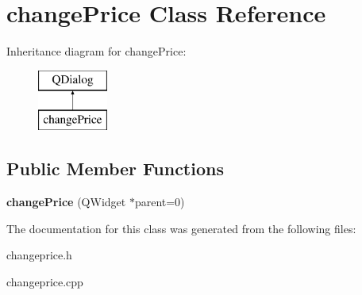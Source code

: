 \hypertarget{classchange_price}{}\section{change\+Price Class Reference}
\label{classchange_price}
Inheritance diagram for change\+Price\+:\begin{figure}[H]
\begin{center}
\leavevmode
\includegraphics[height=2.000000cm]{classchange_price}
\end{center}
\end{figure}
\subsection*{Public Member Functions}
\begin{DoxyCompactItemize}
\item 
\mbox{\label{classchange_price_a7bd9c2db0a96fc215d5d1ff7bbe404db}} 
{\bfseries change\+Price} (Q\+Widget $\ast$parent=0)
\end{DoxyCompactItemize}


The documentation for this class was generated from the following files\+:\begin{DoxyCompactItemize}
\item 
changeprice.\+h\item 
changeprice.\+cpp\end{DoxyCompactItemize}
